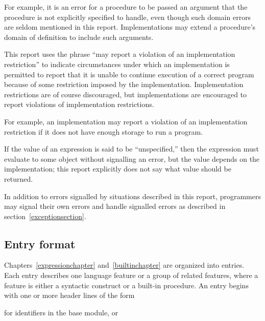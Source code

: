 \vest For example, it is an error for a procedure to be passed an argument that
the procedure is not explicitly specified to handle, even though such
domain errors are seldom mentioned in this report.  Implementations may
extend a procedure's domain of definition to include such arguments.

\vest This report uses the phrase ``may report a violation of an
implementation restriction'' to indicate circumstances under which an
implementation is permitted to report that it is unable to continue
execution of a correct program because of some restriction imposed by the
implementation.  Implementation restrictions are of course discouraged,
but implementations are encouraged to report violations of implementation
restrictions.

\vest For example, an implementation may report a violation of an
implementation restriction if it does not have enough storage to run a
program.

\vest If the value of an expression is said to be ``unspecified,'' then
the expression must evaluate to some object without signalling an error,
but the value depends on the implementation; this report explicitly does
not say what value should be returned. 

\vest In addition to errors signalled by situations described in this
report, programmers may signal their own errors and handle signalled
errors as described in section~\ref{exceptionsection}.




\subsection{Entry format}

Chapters~\ref{expressionchapter} and~\ref{builtinchapter} are organized
into entries.  Each entry describes one language feature or a group of
related features, where a feature is either a syntactic construct or a
built-in procedure.  An entry begins with one or more header lines of the form

\noindent{}\unpenalty

for identifiers in the {\cf base} module, or

\noindent{}\unpenalty

